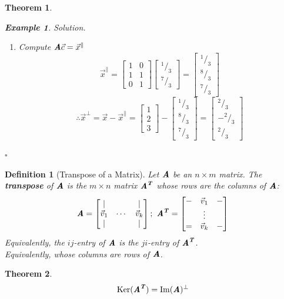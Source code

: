 \documentclass[12pt, a4paper]{article}
\newtheorem{thm}{Theorem}[subsection]
\newtheorem{df}{Definition}[subsection]
\newtheorem{eg}{Example}[subsection]
\newenvironment*{sol}{\indent\textit{Solution. }}{\hfill{$\square$}\par}
\def\T{{\textbf{\emph{T}}}}
\def\IM{{\mathrm{Im}}}
\def\Ker{\mathrm{Ker}}
\def\vecx{\vec{x}}
\def\vecv{\vec{v}}
\def\matrixA{\textbf{\emph{A}}}
\begin{document}
\begin{thm}
\begin{eg}
\begin{sol}
\begin{enumerate}
				\item Compute $\matrixA\vec{c}=\vecx^\parallel$
				\[\vecx^\parallel=\begin{bmatrix}1&0\\1&1\\0&1\end{bmatrix}\begin{bmatrix}^1/_3\\^7/_3\end{bmatrix}=\begin{bmatrix}^1/_3\\^8/_3\\^7/_3\end{bmatrix}\]
				\[\therefore\vecx^\perp=\vecx-\vecx^\parallel=\begin{bmatrix}1\\2\\3\end{bmatrix}-\begin{bmatrix}^1/_3\\^8/_3\\^7/_3\end{bmatrix}=\begin{bmatrix}^2/_3\\-^2/_3\\^2/_3\end{bmatrix}\]
			\end{enumerate}
		\end{sol}
	\end{eg}
\end{thm}
\begin{df}[Transpose of a Matrix]
	Let $\matrixA$ be an $n\times m$ matrix. The \textbf{transpose} of $\matrixA$ is the $m\times n$ matrix $\matrixA^\T$ whose rows are the columns of $\matrixA$: \[\matrixA=\begin{bmatrix}|&&|\\\vecv_1&\cdots&\vecv_k\\|&&|\end{bmatrix};\ \matrixA^\T=\begin{bmatrix}-&\vecv_1&-\\&\vdots&\\=&\vecv_k&-\end{bmatrix}\]	
	Equivalently, the $ij$-entry of $\matrixA$ is the $ji$-entry of $\matrixA^\T$.\\
	Equivalently, whose columns are rows of $\matrixA$.
\end{df}
\begin{thm}
	\[\Ker(\matrixA^\T)=\IM(\matrixA)^\perp\]	
\end{thm}
\end{document}
